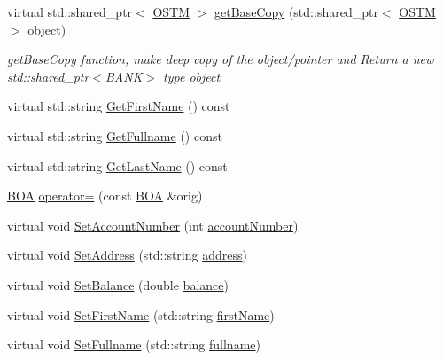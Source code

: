 \begin{DoxyCompactItemize}
\item 
virtual std\+::shared\+\_\+ptr$<$ \hyperlink{class_o_s_t_m}{O\+S\+TM} $>$ \hyperlink{class_b_o_a_a46ace5d3c945a423e93912673cadfad5_a46ace5d3c945a423e93912673cadfad5}{get\+Base\+Copy} (std\+::shared\+\_\+ptr$<$ \hyperlink{class_o_s_t_m}{O\+S\+TM} $>$ object)
\begin{DoxyCompactList}\small\item\em get\+Base\+Copy function, make deep copy of the object/pointer and Return a new std\+::shared\+\_\+ptr$<$\+B\+A\+N\+K$>$ type object \end{DoxyCompactList}\item 
virtual std\+::string \hyperlink{class_b_o_a_ae6bb3df4e1fb210610325ffd1985c7c0_ae6bb3df4e1fb210610325ffd1985c7c0}{Get\+First\+Name} () const 
\item 
virtual std\+::string \hyperlink{class_b_o_a_afafa24a20fda93382782cab66a3079ee_afafa24a20fda93382782cab66a3079ee}{Get\+Fullname} () const 
\item 
virtual std\+::string \hyperlink{class_b_o_a_a081383edefc1f66b80c3fb8862ab070b_a081383edefc1f66b80c3fb8862ab070b}{Get\+Last\+Name} () const 
\item 
\hyperlink{class_b_o_a}{B\+OA} \hyperlink{class_b_o_a_af24b66f0e072b29abbbe5812cab48369_af24b66f0e072b29abbbe5812cab48369}{operator=} (const \hyperlink{class_b_o_a}{B\+OA} \&orig)
\item 
virtual void \hyperlink{class_b_o_a_a6b85963680344bd719ab862a50a09588_a6b85963680344bd719ab862a50a09588}{Set\+Account\+Number} (int \hyperlink{class_b_o_a_a86ca4ad716db205f04c337b39b34d9ba_a86ca4ad716db205f04c337b39b34d9ba}{account\+Number})
\item 
virtual void \hyperlink{class_b_o_a_a2568c0027af6534bd08dde882e892caf_a2568c0027af6534bd08dde882e892caf}{Set\+Address} (std\+::string \hyperlink{class_b_o_a_afb2d7d0c5c05169a72bbc6f1d2cc737f_afb2d7d0c5c05169a72bbc6f1d2cc737f}{address})
\item 
virtual void \hyperlink{class_b_o_a_a0e06a7b7669b6a26a41b37d68f0a87b8_a0e06a7b7669b6a26a41b37d68f0a87b8}{Set\+Balance} (double \hyperlink{class_b_o_a_a2061c36a15924de9186ec5c83dc7da2f_a2061c36a15924de9186ec5c83dc7da2f}{balance})
\item 
virtual void \hyperlink{class_b_o_a_a32fabc2b3acde832f3749696b302a0fe_a32fabc2b3acde832f3749696b302a0fe}{Set\+First\+Name} (std\+::string \hyperlink{class_b_o_a_acb1b3b2a69e403c4e0e3fb08fdbb52a0_acb1b3b2a69e403c4e0e3fb08fdbb52a0}{first\+Name})
\item 
virtual void \hyperlink{class_b_o_a_a7ff134d56805088f46df8eb6f21a0a45_a7ff134d56805088f46df8eb6f21a0a45}{Set\+Fullname} (std\+::string \hyperlink{class_b_o_a_aed3225e383c08b1b7c962a0e43b180d1_aed3225e383c08b1b7c962a0e43b180d1}{fullname})

\end{DoxyCompactItemize}
